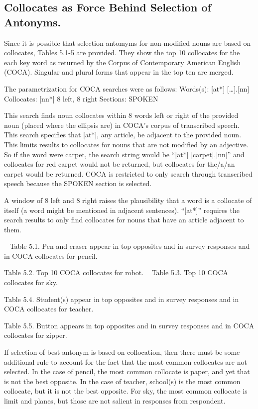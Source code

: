 \subsection {Collocates as Force Behind Selection of Antonyms.} Since it is possible that selection antomyms for non-modified nouns are based on collocates, Tables 5.1-5 are provided.  They show the top 10 collocates for the each key word as returned by the Corpus of Contemporary American English (COCA).  Singular and plural forms that appear in the top ten are merged.  

The parametrization for COCA searches were as follows:
Words(s): 	[at*] […].[nn]
Collocates: 	[nn*] 8 left, 8 right
Sections: 	SPOKEN

This search finds noun collocates within 8 words left or right of the provided noun (placed where the ellipsis are) in COCA’s corpus of transcribed speech.  This search specifies that [at*], any article, be adjacent to the provided noun.  This limits results to collocates for nouns that are not modified by an adjective.  So if the word were carpet, the search string would be “[at*] [carpet].[nn]” and collocates for red carpet would not be returned, but collocates for the/a/an carpet would be returned.  COCA is restricted to only search through transcribed speech because the SPOKEN section is selected.

A window of 8 left and 8 right raises the plausibility that a word is a collocate of itself (a word might be mentioned in adjacent sentences).  “[at*]” requires the search results to only find collocates for nouns that have an article adjacent to them.  

 
	Table 5.1. Pen and eraser appear in top opposites and in survey responses and in COCA collocates for pencil.

	Table 5.2. Top 10 COCA collocates for robot.
	 
	Table 5.3. Top 10 COCA collocates for sky.

	Table 5.4. Student(s) appear in top opposites and in survey responses and in COCA collocates for teacher. 

	Table 5.5. Button appears in top opposites and in survey responses and in COCA collocates for zipper.

If selection of best antonym is based on collocation, then there must be some additional rule to account for the fact that the most common collocates are not selected.  In the case of pencil, the most common collocate is paper, and yet that is not the best opposite.  In the case of teacher, school(s) is the most common collocate, but it is not the best opposite.  For sky, the most common collocate is limit and planes, but those are not salient in responses from respondent.  

